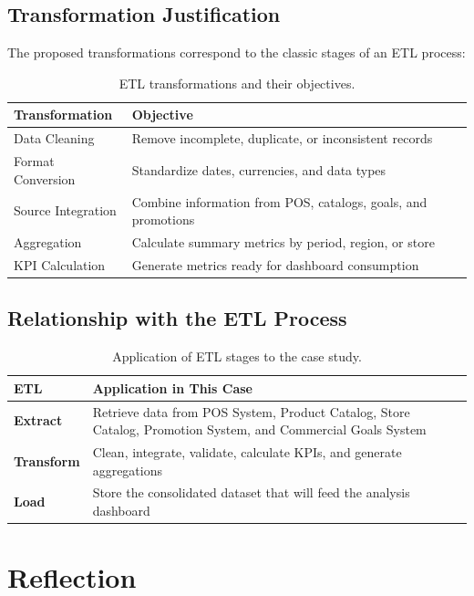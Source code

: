 \documentclass[12pt,a4paper]{article}
\begin{document}
\subsection{Transformation Justification}

The proposed transformations correspond to the classic stages of an ETL process:

\begin{table}[H]
\centering
\begin{tabular}{p{4cm} p{9cm}}
\toprule
\textbf{Transformation} & \textbf{Objective}\\
\midrule
Data Cleaning & Remove incomplete, duplicate, or inconsistent records\\
Format Conversion & Standardize dates, currencies, and data types\\
Source Integration & Combine information from POS, catalogs, goals, and promotions\\
Aggregation & Calculate summary metrics by period, region, or store\\
KPI Calculation & Generate metrics ready for dashboard consumption\\
\bottomrule
\end{tabular}
\caption{ETL transformations and their objectives.}
\end{table}

\subsection{Relationship with the ETL Process}

\begin{table}[H]
\centering
\begin{tabular}{p{2.5cm} p{10.5cm}}
\toprule
\textbf{ETL} & \textbf{Application in This Case}\\
\midrule
\textbf{Extract} & Retrieve data from POS System, Product Catalog, Store Catalog, Promotion System, and Commercial Goals System\\
\textbf{Transform} & Clean, integrate, validate, calculate KPIs, and generate aggregations\\
\textbf{Load} & Store the consolidated dataset that will feed the analysis dashboard\\
\bottomrule
\end{tabular}
\caption{Application of ETL stages to the case study.}
\end{table}

\section{Reflection}
\end{document}

